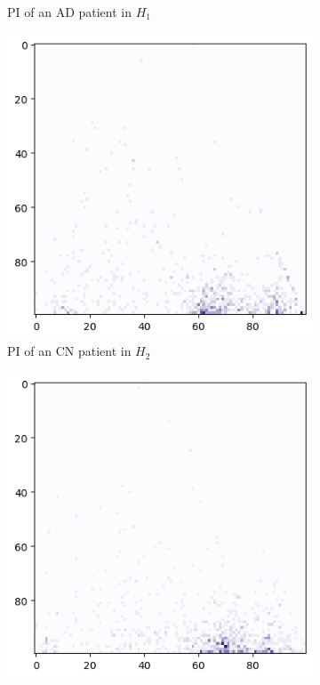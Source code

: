\documentclass{article}
\begin{document}
\begin{figure}[htb]
\begin{subfigure}{0.32\textwidth}
    \caption{PI of an AD patient in $H_1$}
  \end{subfigure}
  \begin{subfigure}{0.32\textwidth}
    \includegraphics[width=\textwidth]{figures/representative_samples/Persistence_image_CN_h_2.png}
    \caption{PI of an CN patient in $H_2$}
  \end{subfigure}
  \begin{subfigure}{0.32\textwidth}
    \includegraphics[width=\textwidth]{figures/representative_samples/Persistence_image_MCI_h_2.png}

\end{subfigure}
\end{figure}
\end{document}
